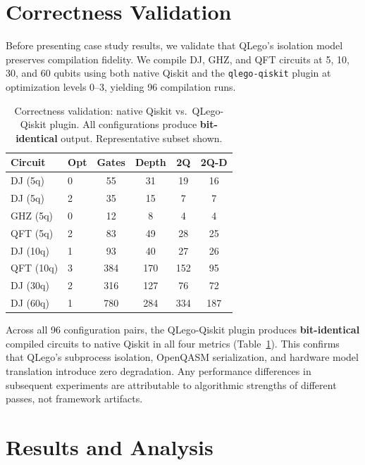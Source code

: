 \documentclass[conference]{IEEEtran}
\begin{document}
\section{Correctness Validation}
\label{sec:validation}

Before presenting case study results, we validate that QLego's isolation model preserves compilation fidelity.
We compile DJ, GHZ, and QFT circuits at 5, 10, 30, and 60 qubits using both native Qiskit and the \texttt{qlego-qiskit} plugin at optimization levels 0--3, yielding 96 compilation runs.

\begin{table}[t]
\centering
\caption{Correctness validation: native Qiskit vs.\ QLego-Qiskit plugin. All configurations produce \textbf{bit-identical} output. Representative subset shown.}
\label{tab:validation}
\begin{tabular}{llcccc}
\toprule
\textbf{Circuit} & \textbf{Opt} & \textbf{Gates} & \textbf{Depth} & \textbf{2Q} & \textbf{2Q-D} \\
\midrule
DJ (5q)   & 0 & 55  & 31  & 19  & 16 \\
DJ (5q)   & 2 & 35  & 15  &  7  &  7 \\
GHZ (5q)  & 0 & 12  &  8  &  4  &  4 \\
QFT (5q)  & 2 & 83  & 49  & 28  & 25 \\
DJ (10q)  & 1 & 93  & 40  & 27  & 26 \\
QFT (10q) & 3 & 384 & 170 & 152 & 95 \\
DJ (30q)  & 2 & 316 & 127 & 76  & 72 \\
DJ (60q)  & 1 & 780 & 284 & 334 & 187 \\
\bottomrule
\end{tabular}
\end{table}

Across all 96 configuration pairs, the QLego-Qiskit plugin produces \textbf{bit-identical} compiled circuits to native Qiskit in all four metrics (Table~\ref{tab:validation}).
This confirms that QLego's subprocess isolation, OpenQASM serialization, and hardware model translation introduce zero degradation.
Any performance differences in subsequent experiments are attributable to algorithmic strengths of different passes, not framework artifacts.


\section{Results and Analysis}
\label{sec:results}
\end{document}
